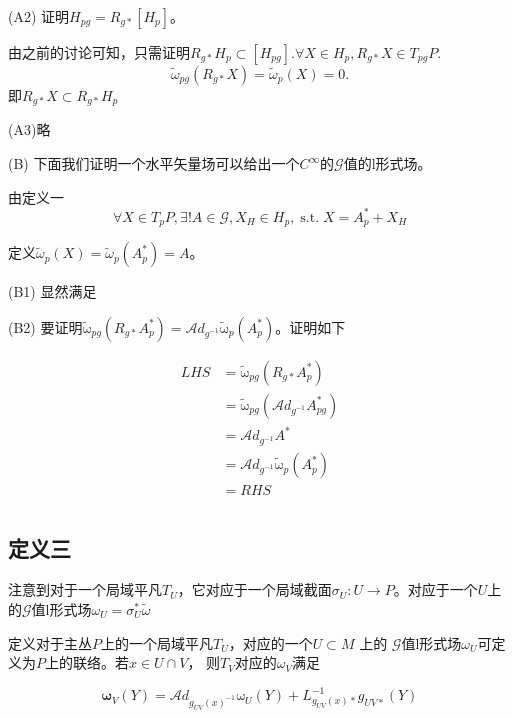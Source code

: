 \documentclass{ctexbook}
\begin{document}
(A2) 证明$H_{pg}=R_{g*}[H_p]$。

由之前的讨论可知，只需证明$R_{g*}H_{p}\subset [H_{pg}]$.$\forall X\in H_{p}, R_{g*}X\in T_{pg}P$.
\[\tilde{\mathscr{\omega}}_{pg}(R_{g*}X)=\tilde{\mathscr{\omega}}_{p}(X)=0.\]
即$R_{g*}X\subset R_{g*}H_p$

(A3)略

(B) 下面我们证明一个水平矢量场可以给出一个$C^{\infty}$的$\mathscr{G}$值的$\mathrm{l}$形式场。

由定义一\[\forall X\in T_p P,\exists!A\in\mathscr{G},X_H\in H_p,\;\text{s.t.}\;X=A_p^{*}+X_H\]

定义$\tilde{\mathscr{\omega}}_p(X)=\tilde{\mathscr{\omega}}_p(A_{p}^{*})=A$。

(B1) 显然满足

(B2) 要证明$\tilde{\mathrm{\omega}}_{pg}(R_{g*}A_p^{*})=\mathscr{A}d_{g^{-1}}\tilde{\mathrm{\omega}}_p(A_p^{*})$。证明如下

\begin{equation}
    \begin{split}
        LHS
        &=\tilde{\mathrm{\omega}}_{pg}\left(R_{g*}A_{p}^{*}\right)\\
        &=\tilde{\mathrm{\omega}}_{pg}\left(\mathscr{A}d_{g^{-1}}A^{*}_{pg}\right)\\
        &=\mathscr{A}d_{g^{-1}}A^{*}\\
        &=\mathscr{A}d_{g^{-1}}\tilde{\mathrm{\omega}}_p(A_p^{*})\\
        &=RHS\\
    \end{split}
\end{equation}


\subsection{定义三}

注意到对于一个局域平凡$T_U$，它对应于一个局域截面$\sigma_U\colon  U\to P$。对应于一个$U$上的$\mathscr{G}$值$\mathrm{l}$形式场$\mathscr{\omega}_U=\sigma_U^*\tilde{\mathscr{\omega}}$


定义对于主丛$P$上的一个局域平凡$T_U$，对应的一个$U\subset M$ 上的 $\mathscr{G}$值$\mathrm{l}$形式场$\mathscr{\omega}_U$可定义为$P$上的联络。若$x\in U\cap V$， 则$T_V$对应的$\mathscr{\omega}_V$满足

\begin{equation}
    \bm{\omega}_V(Y)=\mathscr{A}d_{g_{UV}(x)^{-1}}\mathrm{\omega}_U(Y)+L^{-1}_{g_{UV}(x)*}g_{UV*}(Y)
\end{equation}
\end{document}
